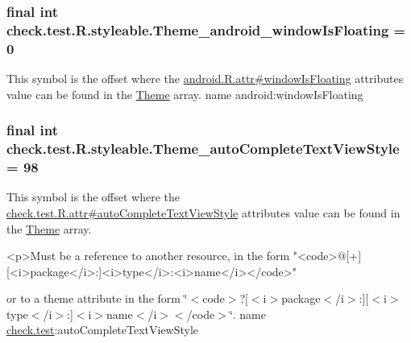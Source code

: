 \subsubsection[{Theme\+\_\+android\+\_\+window\+Is\+Floating}]{\setlength{\rightskip}{0pt plus 5cm}final int check.\+test.\+R.\+styleable.\+Theme\+\_\+android\+\_\+window\+Is\+Floating = 0\hspace{0.3cm}{\ttfamily [static]}}\label{classcheck_1_1test_1_1_r_1_1styleable_a08050f289331059420ffd439bcbc10e8}
This symbol is the offset where the \hyperlink{}{android.\+R.\+attr\#window\+Is\+Floating} attribute\textquotesingle{}s value can be found in the \hyperlink{classcheck_1_1test_1_1_r_1_1styleable_acca726d02016a0cf607782ec3a436a81}{Theme} array.  name android\+:window\+Is\+Floating \hypertarget{classcheck_1_1test_1_1_r_1_1styleable_a2e1e6f06dba491f9e8aa0916badaeee8}{}
\subsubsection[{Theme\+\_\+auto\+Complete\+Text\+View\+Style}]{\setlength{\rightskip}{0pt plus 5cm}final int check.\+test.\+R.\+styleable.\+Theme\+\_\+auto\+Complete\+Text\+View\+Style = 98\hspace{0.3cm}{\ttfamily [static]}}\label{classcheck_1_1test_1_1_r_1_1styleable_a2e1e6f06dba491f9e8aa0916badaeee8}
This symbol is the offset where the \hyperlink{classcheck_1_1test_1_1_r_1_1attr_a13adeb4de5114ee80c3d327c3cde8692}{check.\+test.\+R.\+attr\#auto\+Complete\+Text\+View\+Style} attribute\textquotesingle{}s value can be found in the \hyperlink{classcheck_1_1test_1_1_r_1_1styleable_acca726d02016a0cf607782ec3a436a81}{Theme} array.

\begin{DoxyVerb}      <p>Must be a reference to another resource, in the form "<code>@[+][<i>package</i>:]<i>type</i>:<i>name</i></code>"
\end{DoxyVerb}
 or to a theme attribute in the form \char`\"{}$<$code$>$?\mbox{[}$<$i$>$package$<$/i$>$\+:\mbox{]}\mbox{[}$<$i$>$type$<$/i$>$\+:\mbox{]}$<$i$>$name$<$/i$>$$<$/code$>$\char`\"{}.  name \hyperlink{namespacecheck_1_1test}{check.\+test}\+:auto\+Complete\+Text\+View\+Style \hypertarget{classcheck_1_1test_1_1_r_1_1styleable_a12279ad7c3b04030bd65962776fcef88}{}
